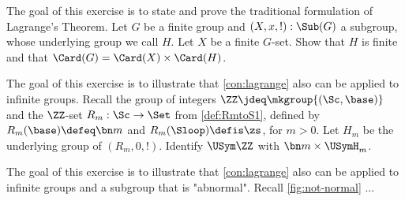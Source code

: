\begin{xca}\label{xca:lagrange}
The goal of this exercise is to state and prove the traditional
formulation of  Lagrange's Theorem. 
Let $G$ be a finite group and $(X,x,!):\Sub(G)$ a subgroup,
whose underlying group we call $H$. 
Let $X$ be a finite $G$-set. Show that $H$ is finite and
that $\Card(G) = \Card(X) \times \Card(H)$.
\end{xca}

\begin{xca}\label{xca:lagrange-Z-action-Rm}
The goal of this exercise is to illustrate that \cref{con:lagrange}
also can be applied to infinite groups. 
Recall the group of integers $\ZZ\jdeq\mkgroup{(\Sc,\base)}$ and the $\ZZ$-set
$R_m: \Sc\to\Set$ from \cref{def:RmtoS1}, defined by $R_m(\base) \defeq \bn m$
and $R_m(\Sloop) \defis \zs$, for $m>0$. Let $H_m$ be the underlying group
of $(R_m,0,!)$. Identify $\USym\ZZ$ with $\bn m \times \USymH_m$.
\end{xca}

\begin{xca}\label{xca:lagrange-if-subgr-not-normal}
The goal of this exercise is to illustrate that \cref{con:lagrange}
also can be applied to infinite groups and a subgroup that is "abnormal".
Recall \cref{fig:not-normal} ...
\end{xca}







